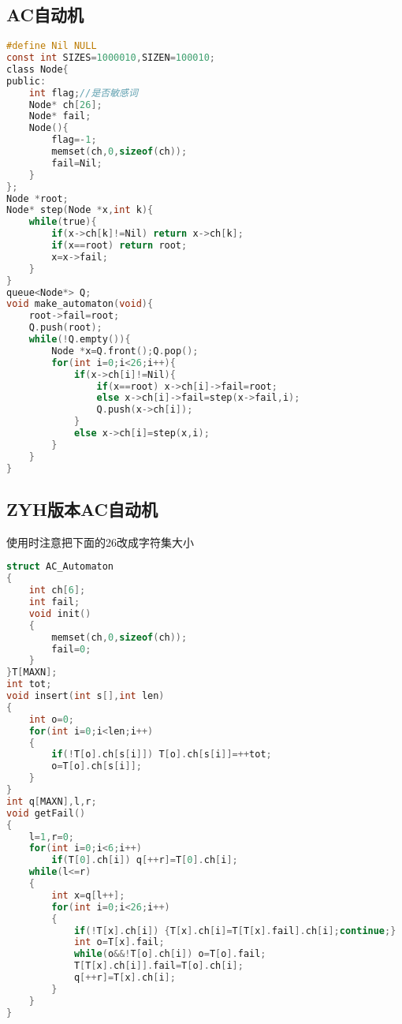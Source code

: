 \subsection{AC自动机}
\begin{lstlisting}[language=C] 
#define Nil NULL
const int SIZES=1000010,SIZEN=100010;
class Node{
public:
	int flag;//是否敏感词
	Node* ch[26];
	Node* fail;
	Node(){
		flag=-1;
		memset(ch,0,sizeof(ch));
		fail=Nil;
	}
};
Node *root;
Node* step(Node *x,int k){
	while(true){
		if(x->ch[k]!=Nil) return x->ch[k];
		if(x==root) return root;
		x=x->fail;
	}
}
queue<Node*> Q;
void make_automaton(void){
	root->fail=root;
	Q.push(root);
	while(!Q.empty()){
		Node *x=Q.front();Q.pop();
		for(int i=0;i<26;i++){
			if(x->ch[i]!=Nil){
				if(x==root) x->ch[i]->fail=root;
				else x->ch[i]->fail=step(x->fail,i);
				Q.push(x->ch[i]);
			}
			else x->ch[i]=step(x,i);
		}
	}
}
\end{lstlisting} 
\subsection{ZYH版本AC自动机}
使用时注意把下面的26改成字符集大小
\begin{lstlisting}[language=C]
struct AC_Automaton
{
    int ch[6];
    int fail;
    void init()
    {
        memset(ch,0,sizeof(ch));
        fail=0;
    }
}T[MAXN];
int tot;
void insert(int s[],int len)
{
    int o=0;
    for(int i=0;i<len;i++)
    {
        if(!T[o].ch[s[i]]) T[o].ch[s[i]]=++tot;
        o=T[o].ch[s[i]];
    }
}
int q[MAXN],l,r;
void getFail()
{
    l=1,r=0;
    for(int i=0;i<6;i++)
        if(T[0].ch[i]) q[++r]=T[0].ch[i];
    while(l<=r)
    {
        int x=q[l++];
        for(int i=0;i<26;i++)
        {
            if(!T[x].ch[i]) {T[x].ch[i]=T[T[x].fail].ch[i];continue;}
            int o=T[x].fail;
            while(o&&!T[o].ch[i]) o=T[o].fail;
            T[T[x].ch[i]].fail=T[o].ch[i];
            q[++r]=T[x].ch[i];
        }
    }
}
\end{lstlisting}
